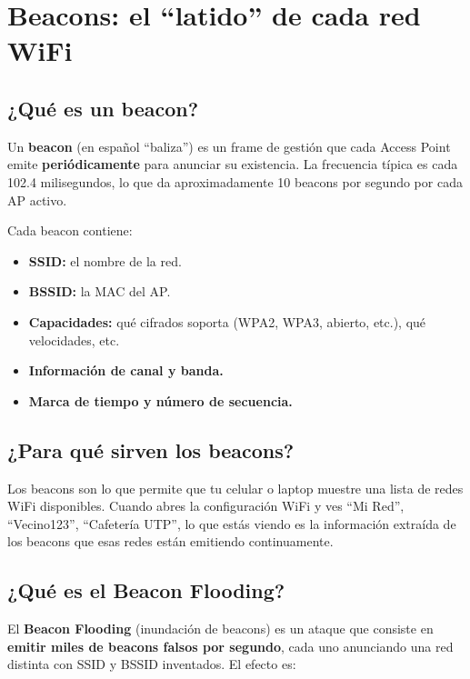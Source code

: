 \documentclass[11pt,a4paper]{article}
\begin{document}
\section{Beacons: el ``latido'' de cada red WiFi}

\subsection{¿Qué es un beacon?}
Un \textbf{beacon} (en español ``baliza'') es un frame de gestión que cada
Access Point emite \textbf{periódicamente} para anunciar su existencia. La
frecuencia típica es cada 102.4 milisegundos, lo que da aproximadamente 10
beacons por segundo por cada AP activo.

Cada beacon contiene:

\begin{itemize}
  \item \textbf{SSID:} el nombre de la red.
  \item \textbf{BSSID:} la MAC del AP.
  \item \textbf{Capacidades:} qué cifrados soporta (WPA2, WPA3, abierto,
    etc.), qué velocidades, etc.
  \item \textbf{Información de canal y banda.}
  \item \textbf{Marca de tiempo y número de secuencia.}
\end{itemize}

\subsection{¿Para qué sirven los beacons?}
Los beacons son lo que permite que tu celular o laptop muestre una lista
de redes WiFi disponibles. Cuando abres la configuración WiFi y ves ``Mi
Red'', ``Vecino123'', ``Cafetería UTP'', lo que estás viendo es la información
extraída de los beacons que esas redes están emitiendo continuamente.

\subsection{¿Qué es el Beacon Flooding?}
El \textbf{Beacon Flooding} (inundación de beacons) es un ataque que
consiste en \textbf{emitir miles de beacons falsos por segundo}, cada uno
anunciando una red distinta con SSID y BSSID inventados. El efecto es:
\end{document}
